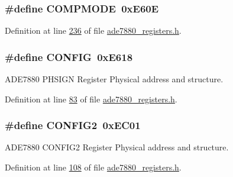 \hypertarget{a00036_a31c8d51fdc4d8181e8a66b9d4be2dd8c}{
\subsubsection[{C\-O\-M\-P\-M\-O\-D\-E}]{\setlength{\rightskip}{0pt plus 5cm}\#define C\-O\-M\-P\-M\-O\-D\-E~0x\-E60\-E}}\label{de/d8c/a00036_a31c8d51fdc4d8181e8a66b9d4be2dd8c}


Definition at line \hyperlink{a00036_source_l00236}{236} of file \hyperlink{a00036_source}{ade7880\-\_\-registers.\-h}.

\hypertarget{a00036_a76ea3cf49247a07c54b3db005a3c7f57}{
\subsubsection[{C\-O\-N\-F\-I\-G}]{\setlength{\rightskip}{0pt plus 5cm}\#define C\-O\-N\-F\-I\-G~0x\-E618}}\label{de/d8c/a00036_a76ea3cf49247a07c54b3db005a3c7f57}


A\-D\-E7880 P\-H\-S\-I\-G\-N Register Physical address and structure. 



Definition at line \hyperlink{a00036_source_l00083}{83} of file \hyperlink{a00036_source}{ade7880\-\_\-registers.\-h}.

\hypertarget{a00036_a9989dac1034e36497f2f4f81613cab88}{
\subsubsection[{C\-O\-N\-F\-I\-G2}]{\setlength{\rightskip}{0pt plus 5cm}\#define C\-O\-N\-F\-I\-G2~0x\-E\-C01}}\label{de/d8c/a00036_a9989dac1034e36497f2f4f81613cab88}


A\-D\-E7880 C\-O\-N\-F\-I\-G2 Register Physical address and structure. 



Definition at line \hyperlink{a00036_source_l00108}{108} of file \hyperlink{a00036_source}{ade7880\-\_\-registers.\-h}.


